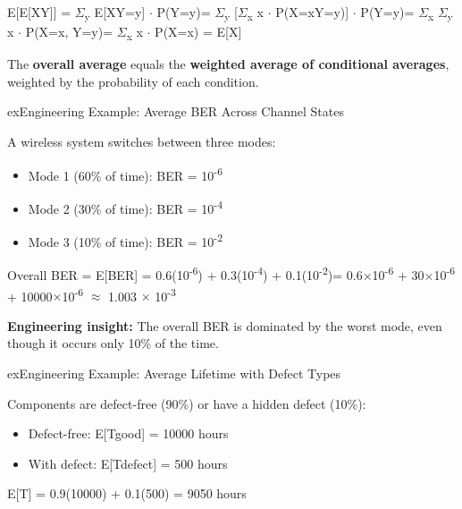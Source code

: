 
E[E[X\textbar{}Y]] = \ensuremath{\Sigma}\textsubscript{y} E[X\textbar{}Y=y] \ensuremath{\cdot} P(Y=y)\PSbr{}= \ensuremath{\Sigma}\textsubscript{y} [\ensuremath{\Sigma}\textsubscript{x} x \ensuremath{\cdot} P(X=x\textbar{}Y=y)] \ensuremath{\cdot} P(Y=y)\PSbr{}= \ensuremath{\Sigma}\textsubscript{x} \ensuremath{\Sigma}\textsubscript{y} x \ensuremath{\cdot} P(X=x, Y=y)\PSbr{}= \ensuremath{\Sigma}\textsubscript{x} x \ensuremath{\cdot} P(X=x) = E[X] \PSyes{}


The \textbf{overall average} equals the \textbf{weighted average of conditional averages}, weighted by the probability of each condition.

\begin{PSbox}[unbreakable]{ex}{Engineering Example: Average BER Across Channel States}

A wireless system switches between three modes:

\begin{itemize}
\tightlist
\item
  Mode 1 (60\% of time): BER = 10\textsuperscript{-6}
\item
  Mode 2 (30\% of time): BER = 10\textsuperscript{-4}
\item
  Mode 3 (10\% of time): BER = 10\textsuperscript{-2}
\end{itemize}

Overall BER = E[BER] = 0.6(10\textsuperscript{-6}) + 0.3(10\textsuperscript{-4}) + 0.1(10\textsuperscript{-2})\PSbr{}= 0.6\ensuremath{\times}10\textsuperscript{-6} + 30\ensuremath{\times}10\textsuperscript{-6} + 10000\ensuremath{\times}10\textsuperscript{-6} \ensuremath{\approx} 1.003 \ensuremath{\times} 10\textsuperscript{-3}

\textbf{Engineering insight:} The overall BER is dominated by the worst mode, even though it occurs only 10\% of the time.

\end{PSbox}

\begin{PSbox}[unbreakable]{ex}{Engineering Example: Average Lifetime with Defect Types}

Components are defect-free (90\%) or have a hidden defect (10\%):

\begin{itemize}
\tightlist
\item
  Defect-free: E[T\textbar{}good] = 10000 hours
\item
  With defect: E[T\textbar{}defect] = 500 hours
\end{itemize}

E[T] = 0.9(10000) + 0.1(500) = 9050 hours

\end{PSbox}

